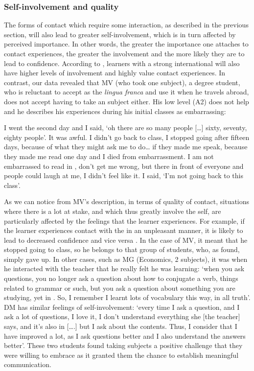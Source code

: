 \documentclass[output=paper]{langsci/langscibook}
\begin{document}
\subsubsection{Self-involvement and quality} 
The forms of contact which require some interaction, as described in the previous section, will also lead to greater self-involvement, which is in turn affected by perceived importance.  In other words, the greater the importance one attaches to  contact experiences, the greater the involvement and the more likely they are to lead to  confidence. According to \citet{Yashima2002,Yashima2009}, learners with a strong international  will also have higher levels of involvement and highly value  contact experiences. In contrast, our data revealed that MV (who took one  subject), a  degree student, who is reluctant to accept  as the \textit{lingua franca} and use it when he travels abroad, does not accept having to take an  subject either. His low  level (A2) does not help and he describes his experiences during his initial  classes as embarrassing:



I went the second day and I said, ‘oh there are so many people […] sixty, seventy, eighty people’. It was awful. I didn’t go back to class, I stopped going after fifteen days, because of what they might ask me to do… if they made me speak, because they made me read one day and I died from embarrassment. I am not embarrassed to read in , don’t get me wrong, but there in front of everyone and people could laugh at me, I didn’t feel like it. I said, ‘I’m not going back to this class’.



As we can notice from MV’s description, in terms of quality of contact, situations where there is a lot at stake, and which thus greatly involve the self, are particularly affected by the feelings that the learner experiences. For example, if the learner experiences contact with the  in an unpleasant manner, it is likely to lead to decreased  confidence and vice versa \citep{SampasivamClément2014}. In the case of MV, it meant that he stopped going to class, so he belongs to that group of students, who, as  \citet{Coyle2007}  found,  simply gave up.  In other cases, such as MG (Economics, 2  subjects), it was when he interacted with the teacher that he really felt he was learning: ‘when you ask questions, you no longer ask a question about how to conjugate a verb, things related to grammar or such, but you ask a question about something you are studying, yet in . So, I remember I learnt lots of vocabulary this way, in all truth’. DM has similar feelings of self-involvement: ‘every time I ask a question, and I ask a lot of questions, I love it, I don’t understand everything she [the teacher] says, and it’s also in  [….] but I ask about the contents. Thus, I consider that I have improved a lot, as I ask questions better and I also understand the answers better’. These two students found taking  subjects a positive challenge that they were willing to embrace as it granted them the chance to establish meaningful communication. 
\end{document}

